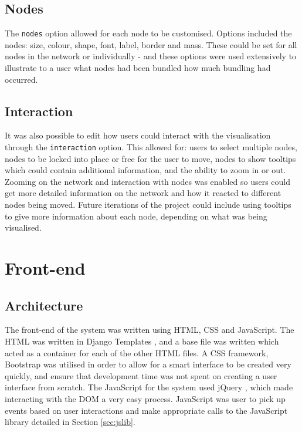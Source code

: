 \documentclass[../dissertation.tex]{subfiles}
\begin{document}
\subsection{Nodes}

The \texttt{nodes} option allowed for each node to be customised. Options included the nodes: size, colour, shape, font, label, border and mass. These could be set for all nodes in the network or individually - and these options were used extensively to illustrate to a user what nodes had been bundled how much bundling had occurred.

\subsection{Interaction}

It was also possible to edit how users could interact with the visualisation through the \texttt{interaction} option. This allowed for: users to select multiple nodes, nodes to be locked into place or free for the user to move, nodes to show tooltips which could contain additional information, and the ability to zoom in or out. Zooming on the network and interaction with nodes was enabled so users could get more detailed information on the network and how it reacted to different nodes being moved. Future iterations of the project could include using tooltips to give more information about each node, depending on what was being visualised.

\section{Front-end}

\subsection{Architecture}

The front-end of the system was written using HTML, CSS and JavaScript. The HTML was written in Django Templates \cite{django-docs-templates}, and a base file was written which acted as a container for each of the other HTML files. A CSS framework, Bootstrap \cite{bootstrap} was utilised in order to allow for a smart interface to be created very quickly, and ensure that development time was not spent on creating a user interface from scratch. The JavaScript for the system used jQuery \cite{jQuery}, which made interacting with the DOM a very easy process. JavaScript was user to pick up events based on user interactions and make appropriate calls to the JavaScript library detailed in Section \ref{sec:jslib}.
\end{document}
